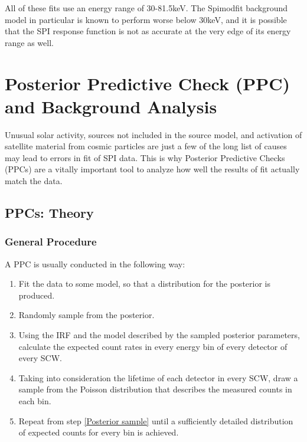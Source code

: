 \documentclass{report}
\begin{document}
All of these fits use an energy range of 30-81.5keV. The Spimodfit background model in particular is known to perform worse below 30keV, and it is possible that the SPI response function is not as accurate at the very edge of its energy range as well.





\section{Posterior Predictive Check (PPC) and Background Analysis} \label{sec:PPC Back}
Unusual solar activity, sources not included in the source model, and activation of satellite material from cosmic particles are just a few of the long list of causes may lead to errors in fit of SPI data. This is why Posterior Predictive Checks (PPCs) are a vitally important tool to analyze how well the results of fit actually match the data.

\subsection{PPCs: Theory}

\subsubsection{General Procedure} \label{PPC general}

A PPC is usually conducted in the following way:

\begin{enumerate}
    \item Fit the data to some model, so that a distribution for the posterior is produced.
    \item \label{Posterior sample} Randomly sample from the posterior.
    \item \label{ppc calc count rates} Using the IRF and the model described by the sampled posterior parameters, calculate the expected count rates in every energy bin of every detector of every SCW.
    \item \label{ppc poisson sample} Taking into consideration the lifetime of each detector in every SCW, draw a sample from the Poisson distribution that describes the measured counts in each bin.
    \item Repeat from step \ref{Posterior sample} until a sufficiently detailed distribution of expected counts for every bin is achieved.
\end{enumerate}
\end{document}
